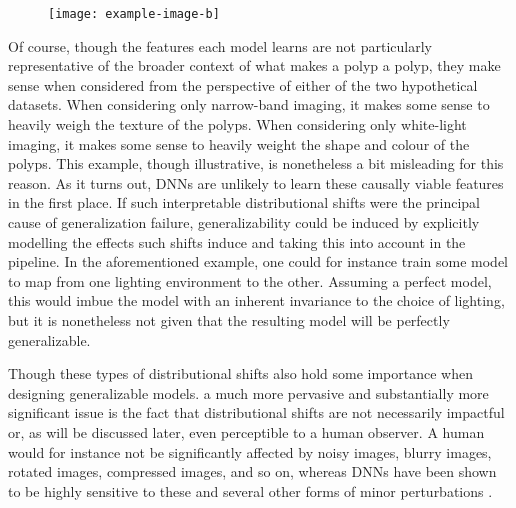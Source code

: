		\begin{figure}[H]
			\texttt{[image: example-image-b]}
			\caption{}
			\label{imaging_modalities}
		\end{figure}

		Of course, though the features each model learns are not particularly representative of the broader context of what makes a polyp a polyp, they make sense when considered from the perspective of either of the two hypothetical datasets. When considering only narrow-band imaging, it makes some sense to heavily weigh the texture of the polyps. When considering only white-light imaging, it makes some sense to heavily weight the shape and colour of the polyps. This example, though illustrative, is nonetheless a bit misleading for this reason. As it turns out, DNNs are unlikely to learn these causally viable features in the first place. If such interpretable distributional shifts were the principal cause of generalization failure, generalizability could be induced by explicitly modelling the effects such shifts induce and taking this into account in the pipeline. In the aforementioned example, one could for instance train some model to map from one lighting environment to the other. Assuming a perfect model, this would imbue the model with an inherent invariance to the choice of lighting, but it is nonetheless not given that the resulting model will be perfectly generalizable.

		Though these types of distributional shifts also hold some importance when designing generalizable models. a much more pervasive and substantially more significant issue is the fact that distributional shifts are not necessarily impactful or, as will be discussed later, even perceptible to a human observer. A human would for instance not be significantly affected by noisy images, blurry images, rotated images, compressed images, and so on, whereas DNNs have been shown to be highly sensitive to these and several other forms of minor perturbations \cite{noise_robustness, corruption_robustness,adversarial_training}. 

		
